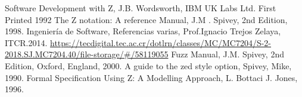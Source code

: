 \documentclass[12pt,a4paper]{article}
\begin{document}
\newpage
\begin{thebibliography}{00}
 Software Development with Z, J.B. Wordsworth, IBM UK Labs Ltd. First Printed 1992
 The Z notation: A reference Manual, J.M . Spivey, 2nd Edition, 1998.
 Ingeniería de Software, Referencias varias, Prof.Ignacio Trejos Zelaya, ITCR.2014. \url{https://tecdigital.tec.ac.cr/dotlrn/classes/MC/MC7204/S-2-2018.SJ.MC7204.40/file-storage/#/58119055}
 Fuzz Manual, J.M. Spivey, 2nd Edition, Oxford, England, 2000.
 A guide to the zed style option, Spivey, Mike, 1990.
 Formal Specification Using Z: A Modelling Approach, L. Bottaci J. Jones, 1996.


\end{thebibliography}
\end{document}

